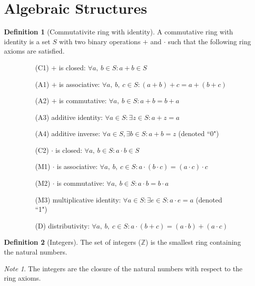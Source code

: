 \documentclass{article}
\newcommand*{\Z}{\mathbb{Z}}
\theoremstyle{plain}
\numberwithin{theorem}{subsection}
\theoremstyle{definition}
\newtheorem{definition}{Definition}[section]
\numberwithin{definition}{subsection}
\theoremstyle{remark}
\newtheorem{note}{Note}[section]
\numberwithin{note}{section}
\begin{document}
\section{Algebraic Structures}
\begin{definition}[Commutativite ring with identity]
	A commutative ring with identity is a set $S$ with two binary operations $+$ and $\cdot$ such that the following ring axioms are satisfied.
\end{definition}
\begin{figure}[H]
	\begin{mdframed}[style=exampledefault,frametitle={Ring Axioms}]
		\begin{enumerate}[leftmargin=3.5em, itemsep=0.2em, topsep=0.35em]
			\item [(C1)] $+$ is closed: $\forall a,\:b \in S: a+b \in S$
			\item [(A1)] $+$ is associative: $\forall a,\:b,\:c \in S: (a+b)+c = a+(b+c)$
			\item [(A2)] $+$ is commutative: $\forall a,\:b \in S: a+b=b+a$
			\item [(A3)] additive identity: $\forall a\in S:\exists z \in S:a+z=a$
			\item [(A4)] additive inverse: $\forall a \in S, \exists b\in S: a+b = z$ (denoted ``0")
			\item [(C2)] $\cdot$ is closed: $\forall a,\:b \in S: a \cdot b \in S$
			\item [(M1)] $\cdot$ is associative: $\forall a,\:b,\:c \in S:a \cdot (b \cdot c) = (a \cdot c) \cdot c$
			\item [(M2)] $\cdot$ is commutative: $\forall a,\:b \in S:a \cdot b = b \cdot a$
			\item [(M3)] multiplicative identity: $\forall a \in S:\exists e \in S:a \cdot e = a$ (denoted ``1")
			\item [(D)] distributivity: $\forall a,\:b,\:c \in S: a \cdot (b + c) = (a \cdot b) + (a \cdot c)$
		\end{enumerate}
	\end{mdframed}
\end{figure}
%
\begin{definition}[Integers]
    The set of integers ($\Z$) is the smallest ring containing the natural numbers.
\end{definition}
\begin{note}
    The integers are the closure of the natural numbers with respect to the ring axioms.
\end{note}
\end{document}
